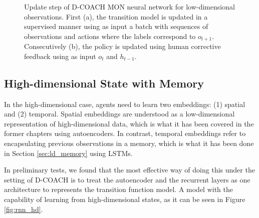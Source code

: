 \begin{figure}[h]
\centering
{}
\caption[Update step of D-COACH MON neural network for low-dimensional observations.]{Update step of D-COACH MON neural network for low-dimensional observations. First (a), the transition model is updated in a supervised manner using as input a batch with sequences of observations and actions where the labels correspond to $o_{t+1}$. Consecutively (b), the policy is updated using human corrective feedback using as input $o_{t}$ and $h_{t-1}$.} 
\label{fig:ld_mon_train} 
\end{figure}

\subsection{High-dimensional State with Memory}
In the high-dimensional case, agents need to learn two embeddings: (1) spatial and (2) temporal. Spatial embeddings are understood as a low-dimensional representation of high-dimensional data, which is what it has been covered in the former chapters using autoencoders. In contrast, temporal embeddings refer to encapsulating previous observations in a memory, which is what it has been done in Section \ref{sec:ld_memory} using LSTMs. 

In preliminary tests, we found that the most effective way of doing this under the setting of D-COACH is to treat the autoencoder and the recurrent layers as one architecture to represents the transition function model. A model with the capability of learning from high-dimensional states, as it can be seen in Figure \ref{fig:rnn_hd}. 

